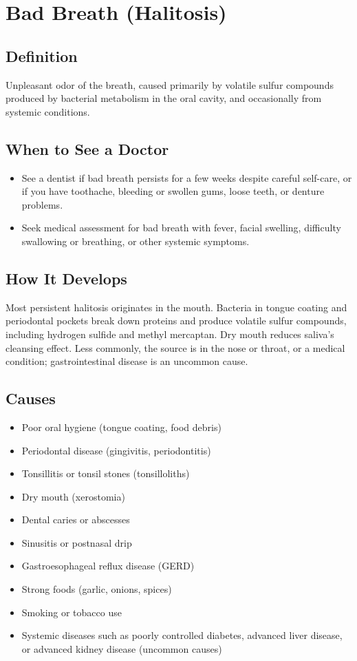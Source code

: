 \chapter{Bad Breath (Halitosis)}

\section*{Definition}
Unpleasant odor of the breath, caused primarily by volatile sulfur compounds produced by bacterial metabolism in the oral cavity, and occasionally from systemic conditions.

\section*{When to See a Doctor}

\begin{itemize}
 \item See a dentist if bad breath persists for a few weeks despite careful self-care, or if you have toothache, bleeding or swollen gums, loose teeth, or denture problems.
 \item Seek medical assessment for bad breath with fever, facial swelling, difficulty swallowing or breathing, or other systemic symptoms.
\end{itemize}

\section*{How It Develops}
Most persistent halitosis originates in the mouth. Bacteria in tongue coating and periodontal pockets break down proteins and produce volatile sulfur compounds, including hydrogen sulfide and methyl mercaptan. Dry mouth reduces saliva's cleansing effect. Less commonly, the source is in the nose or throat, or a medical condition; gastrointestinal disease is an uncommon cause.

\section*{Causes}
\begin{itemize}
 \item Poor oral hygiene (tongue coating, food debris)
 \item Periodontal disease (gingivitis, periodontitis)
 \item Tonsillitis or tonsil stones (tonsilloliths)
 \item Dry mouth (xerostomia)
 \item Dental caries or abscesses
 \item Sinusitis or postnasal drip
 \item Gastroesophageal reflux disease (GERD)
 \item Strong foods (garlic, onions, spices)
 \item Smoking or tobacco use
 \item Systemic diseases such as poorly controlled diabetes, advanced liver disease, or advanced kidney disease (uncommon causes)
\end{itemize}

